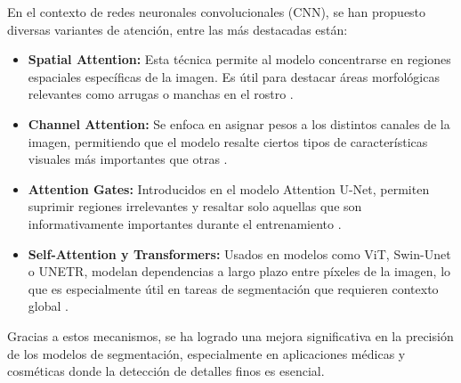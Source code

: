 En el contexto de redes neuronales convolucionales (CNN), se han propuesto diversas variantes de atención, entre las más destacadas están:

\begin{itemize}
    \item \textbf{Spatial Attention:} Esta técnica permite al modelo concentrarse en regiones espaciales específicas de la imagen. Es útil para destacar áreas morfológicas relevantes como arrugas o manchas en el rostro \cite{woo2018cbam}.
    
    \item \textbf{Channel Attention:} Se enfoca en asignar pesos a los distintos canales de la imagen, permitiendo que el modelo resalte ciertos tipos de características visuales más importantes que otras \cite{hu2018senet}.
    
    \item \textbf{Attention Gates:} Introducidos en el modelo Attention U-Net, permiten suprimir regiones irrelevantes y resaltar solo aquellas que son informativamente importantes durante el entrenamiento \cite{oktay2018attentionunet}.
    
    \item \textbf{Self-Attention y Transformers:} Usados en modelos como ViT, Swin-Unet o UNETR, modelan dependencias a largo plazo entre píxeles de la imagen, lo que es especialmente útil en tareas de segmentación que requieren contexto global \cite{vaswani2017attention}.
\end{itemize}

Gracias a estos mecanismos, se ha logrado una mejora significativa en la precisión de los modelos de segmentación, especialmente en aplicaciones médicas y cosméticas donde la detección de detalles finos es esencial.








